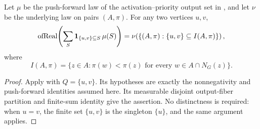 \begin{helper}
Let $\mu$ be the push-forward law of the activation--priority output set in
, and let $\nu$ be the underlying law
on pairs $(A,\pi)$.  For any two vertices $u,v$,
\[
\operatorname{ofReal}\!\left(\sum_S
  {\bf 1}_{\{u,v\}\subseteq S}\,\mu(S)\right)
=
\nu\!\left(\{(A,\pi):\{u,v\}\subseteq I(A,\pi)\}\right),
\]
where
\[
I(A,\pi)=\{z\in A:\pi(w)<\pi(z)\text{ for every }w\in A\cap N_G(z)\}.
\]
\end{helper}
\begin{proof}
Apply  with $Q=\{u,v\}$.
Its hypotheses are exactly the nonnegativity and push-forward identities
assumed here. Its measurable disjoint output-fiber partition and finite-sum
identity give the assertion. No distinctness is required: when $u=v$,
the finite set $\{u,v\}$ is the singleton $\{u\}$, and the same argument applies.
\end{proof}

